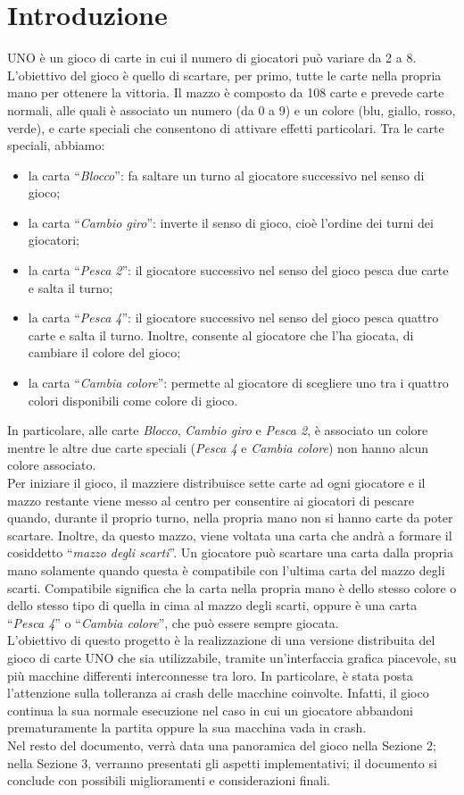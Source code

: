 \documentclass[11pt]{article} %
\begin{document}
\section{Introduzione}
UNO è un gioco di carte in cui il numero di giocatori può variare da 2 a 8. L'obiettivo del gioco è quello di scartare, per primo, tutte le carte nella 
propria mano per ottenere la vittoria. 
Il mazzo è composto da 108 carte e prevede carte normali, alle quali è associato un numero (da 0 a 9) e un colore (blu, giallo, rosso, verde), e carte speciali
che consentono di attivare effetti particolari. Tra le carte speciali, abbiamo:
\begin{itemize}
 \item la carta ``\emph{Blocco}'': fa saltare un turno al giocatore successivo nel senso di gioco;
 \item la carta ``\emph{Cambio giro}'': inverte il senso di gioco, cioè l'ordine dei turni dei giocatori;
 \item la carta ``\emph{Pesca 2}'': il giocatore successivo nel senso del gioco pesca due carte e salta il turno;
 \item la carta ``\emph{Pesca 4}'': il giocatore successivo nel senso del gioco pesca quattro carte e salta il turno. Inoltre, consente al giocatore che l'ha
 giocata, di cambiare il colore del gioco; 
 \item la carta ``\emph{Cambia colore}'': permette al giocatore di scegliere uno tra i quattro colori disponibili come colore di gioco.
\end{itemize}
In particolare, alle carte \emph{Blocco}, \emph{Cambio giro} e \emph{Pesca 2}, è associato un colore mentre le altre due carte speciali (\emph{Pesca 4} e 
\emph{Cambia colore}) non hanno alcun colore associato.\\
Per iniziare il gioco, il mazziere distribuisce sette carte ad ogni giocatore e il mazzo restante viene
messo al centro per consentire ai giocatori di pescare quando, durante il proprio turno, nella propria mano non si hanno carte da poter scartare. 
Inoltre, da questo mazzo, viene voltata una carta che andrà a formare il cosiddetto ``\emph{mazzo degli scarti}''. 
Un giocatore può scartare una carta dalla propria mano solamente quando questa è compatibile con l'ultima carta del mazzo degli scarti. 
Compatibile significa che la carta nella propria mano è dello stesso colore o dello stesso tipo di quella in cima
al mazzo degli scarti, oppure è una carta ``\emph{Pesca 4}'' o ``\emph{Cambia colore}'', che può essere sempre giocata.\\
L'obiettivo di questo progetto è la realizzazione di una versione distribuita del gioco di carte UNO che sia utilizzabile, tramite un'interfaccia grafica 
piacevole, su più macchine differenti interconnesse tra loro. In particolare, è stata posta l'attenzione sulla tolleranza ai crash delle macchine coinvolte.
Infatti, il gioco continua la sua normale esecuzione nel caso in cui un giocatore abbandoni prematuramente la partita oppure la sua macchina vada in crash.\\
Nel resto del documento, verrà data una panoramica del gioco nella Sezione 2; nella Sezione 3, verranno presentati gli aspetti implementativi;
il documento si conclude con possibili miglioramenti e considerazioni finali.
\end{document}
